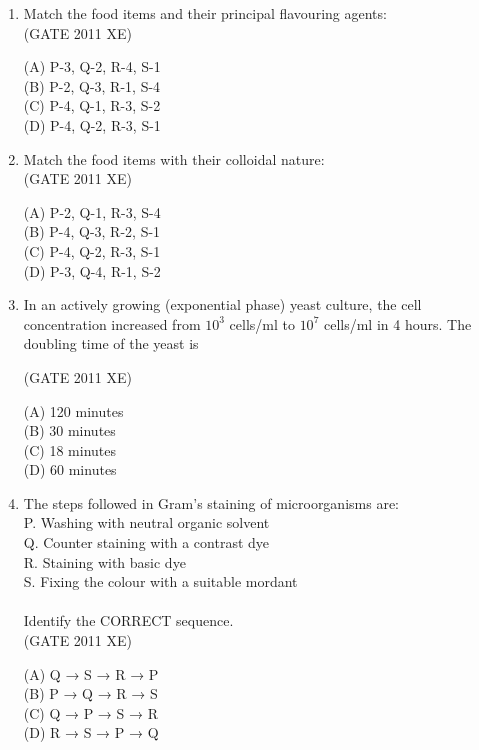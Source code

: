 \documentclass[journal,12pt,onecolumn]{IEEEtran}
\begin{document}
\begin{enumerate}
\begin{enumerate}
\begin{enumerate}
\item Match the food items and their principal flavouring agents:\\




\hfill{(GATE 2011 XE)} \\
\begin{multicols}{2}
(A) P-3, Q-2, R-4, S-1 \\
(B) P-2, Q-3, R-1, S-4 \\
(C) P-4, Q-1, R-3, S-2 \\
(D) P-4, Q-2, R-3, S-1
\end{multicols}

\item Match the food items with their colloidal nature:\\




\hfill{(GATE 2011 XE)} \\
\begin{multicols}{2}
(A) P-2, Q-1, R-3, S-4 \\
(B) P-4, Q-3, R-2, S-1 \\
(C) P-4, Q-2, R-3, S-1 \\
(D) P-3, Q-4, R-1, S-2
\end{multicols}

\newpage

\item In an actively growing (exponential phase) yeast culture, the cell concentration increased from $10^3$ cells/ml to $10^7$ cells/ml in 4 hours. The doubling time of the yeast is

\hfill{(GATE 2011 XE)} \\
\begin{multicols}{2}
(A) 120 minutes \\
(B) 30 minutes \\
(C) 18 minutes \\
(D) 60 minutes
\end{multicols}

\item The steps followed in Gram's staining of microorganisms are: \\
P. Washing with neutral organic solvent \\
Q. Counter staining with a contrast dye \\
R. Staining with basic dye \\
S. Fixing the colour with a suitable mordant \\ \\
Identify the CORRECT sequence. \\
\hfill{(GATE 2011 XE)} \\
\begin{multicols}{2}
(A) Q → S → R → P \\
(B) P → Q → R → S \\
(C) Q → P → S → R \\
(D) R → S → P → Q
\end{multicols}


\end{enumerate}
\end{enumerate}
\end{enumerate}
\end{document}
